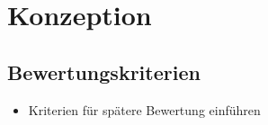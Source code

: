 \chapter{Konzeption}

\section{Bewertungskriterien}

\begin{itemize}
	\item Kriterien für spätere Bewertung einführen
\end{itemize}
